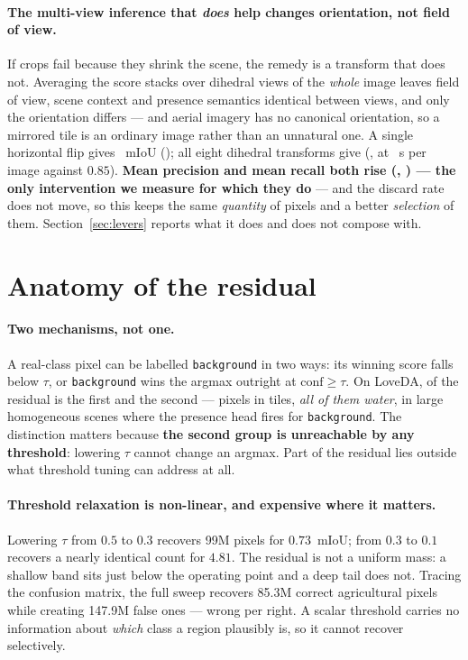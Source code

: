 \documentclass[10pt,a4paper]{article}                        %
\newcommand{\best}[1]{\textbf{#1}}
\newcommand{\bg}{\texttt{background}}
\begin{document}
\paragraph{The multi-view inference that \emph{does} help changes orientation,
not field of view.} If crops fail because they shrink the scene, the remedy is a
transform that does not. Averaging the score stacks over dihedral views of the
\emph{whole} image leaves field of view, scene context and presence semantics
identical between views, and only the orientation differs --- and aerial imagery
has no canonical orientation, so a mirrored tile is an ordinary image rather than
an unnatural one. A single horizontal flip gives \ttaHflip{}~mIoU
(\ttaHflipD{}); all eight dihedral transforms give \ttaDfour{} (\ttaDfourD{}, at
\ttaCost{}~s per image against $0.85$). \best{Mean precision and mean recall both
rise (\ttaPrec{}, \ttaRec{}) --- the only intervention we measure for which they
do} --- and the discard rate does not move, so this keeps the same \emph{quantity}
of pixels and a better \emph{selection} of them. Section~\ref{sec:levers} reports
what it does and does not compose with.

\section{Anatomy of the residual}
\label{sec:anatomy}

\paragraph{Two mechanisms, not one.} A real-class pixel can be labelled \bg{} in
two ways: its winning score falls below $\tau$, or \bg{} wins the argmax outright
at $\mathrm{conf}\ge\tau$. On LoveDA, \mechA{} of the residual is the first and
\mechB{} the second --- \mechBpx{} pixels in \mechBtiles{} tiles, \emph{all of
them water}, in large homogeneous scenes where the presence head fires for \bg{}.
The distinction matters because \best{the second group is unreachable by any
threshold}: lowering $\tau$ cannot change an argmax. Part of the residual lies
outside what threshold tuning can address at all.

\paragraph{Threshold relaxation is non-linear, and expensive where it matters.}
Lowering $\tau$ from $0.5$ to $0.3$ recovers 99M pixels for
$0.73$~mIoU; from $0.3$ to $0.1$ recovers a nearly identical count for $4.81$.
The residual is not a uniform mass: a shallow band sits just below the operating
point and a deep tail does not. Tracing the confusion matrix, the full sweep
recovers 85.3M correct agricultural pixels while creating
147.9M false ones --- \tauRatio{} wrong per right. A scalar
threshold carries no information about \emph{which} class a region plausibly is,
so it cannot recover selectively.
\end{document}
